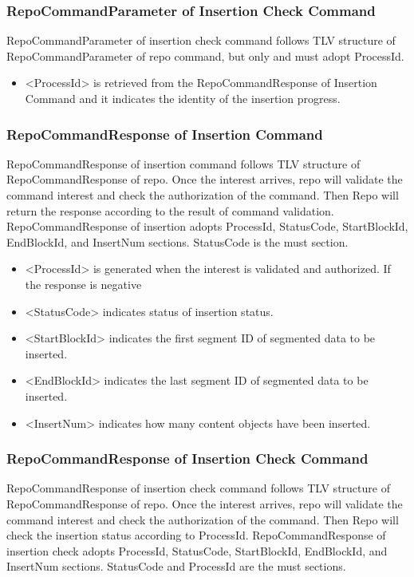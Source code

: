 \documentclass{acm_proc_article-sp}
\begin{document}
\subsubsection{RepoCommandParameter of Insertion Check Command}
RepoCommandParameter of insertion check command follows TLV structure of RepoCommandParameter of repo command, but only and must adopt ProcessId.

\begin{itemize}
\item <ProcessId> is retrieved from the RepoCommandResponse of Insertion Command and it indicates the identity of the insertion progress.
\end{itemize}

\subsubsection{RepoCommandResponse of Insertion Command}
RepoCommandResponse of insertion command follows TLV structure of RepoCommandResponse of repo. Once the interest arrives, repo will validate the command interest and check the authorization of the command. Then Repo will return the response according to the result of command validation. RepoCommandResponse of insertion adopts ProcessId, StatusCode, StartBlockId, EndBlockId, and InsertNum sections. StatusCode is the must section.

\begin{itemize}
\item <ProcessId> is generated when the interest is validated and authorized. If the response is negative
\item <StatusCode> indicates status of insertion status.
\item <StartBlockId> indicates the first segment ID of segmented data to be inserted.
\item <EndBlockId> indicates the last segment ID of segmented data to be inserted.
\item <InsertNum> indicates how many content objects have been inserted.
\end{itemize}

\subsubsection{RepoCommandResponse of Insertion Check Command}
RepoCommandResponse of insertion check command follows TLV structure of RepoCommandResponse of repo. Once the interest arrives, repo will validate the command interest and check the authorization of the command. Then Repo will check the insertion status according to ProcessId. RepoCommandResponse of insertion check adopts ProcessId, StatusCode, StartBlockId, EndBlockId, and InsertNum sections. StatusCode and ProcessId are the must sections.
\end{document}
